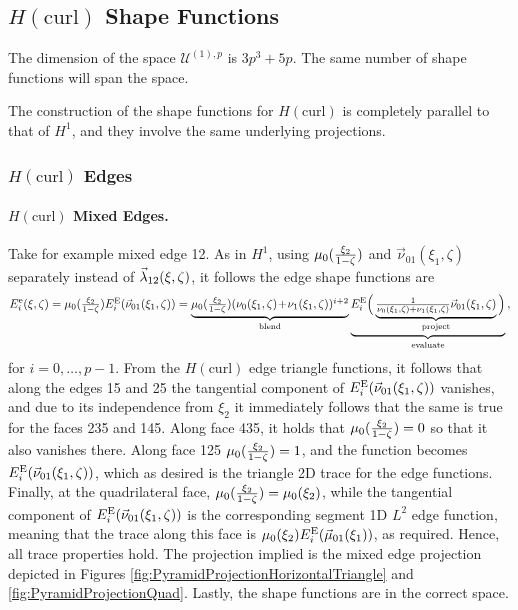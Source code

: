 \subsection{\texorpdfstring{$H(\mathrm{curl})$}{Hcurl} Shape Functions}

The dimension of the space $\mathcal{U}^{(1),p}$ is $3p^3+5p$.
The same number of shape functions will span the space.

The construction of the shape functions for $H(\mathrm{curl})$ is completely parallel to that of $H^1$, and they involve the same underlying projections.

\subsubsection{\texorpdfstring{$H(\mathrm{curl})$}{Hcurl} Edges}

\paragraph{\texorpdfstring{$H(\mathrm{curl})$}{Hcurl} Mixed Edges.} 
Take for example mixed edge 12.
As in $H^1$, using $\mu_0(\textstyle{\frac{\xi_2}{1-\zeta}})$ and $\vec{\nu}_{01}(\xi_1,\zeta)$ separately instead of $\vec{\lambda}_{12}(\xi,\zeta)$, it follows the edge shape functions are
\begin{equation*}
	E_i^\mathrm{e}(\xi,\zeta)=\mu_0(\textstyle{\frac{\xi_2}{1-\zeta}})E_i^{\mathrm{E}}(\vec{\nu}_{01}(\xi_1,\zeta))=
		\underbrace{\mu_0(\textstyle{\frac{\xi_2}{1-\zeta}})(\nu_0(\xi_1,\zeta)\!+\!\nu_1(\xi_1,\zeta))^{i+2}}_{\text{blend}}
    	\underbrace{E_i^{\mathrm{E}}\Big(\underbrace{\textstyle{\frac{1}{\nu_0(\xi_1,\zeta)+\nu_1(\xi_1,\zeta)}}
    		\vec{\nu}_{01}(\xi_1,\zeta)}_{\text{project}}\Big)}_{\text{evaluate}}\,,
\end{equation*}
for $i=0,\ldots,p-1$.
From the $H(\mathrm{curl})$ edge triangle functions, it follows that along the edges 15 and 25 the tangential component of $E_i^{\mathrm{E}}(\vec{\nu}_{01}(\xi_1,\zeta))$ vanishes, and due to its independence from $\xi_2$ it immediately follows that the same is true for the faces 235 and 145.
Along face 435, it holds that $\mu_0(\textstyle{\frac{\xi_2}{1-\zeta}})=0$ so that it also vanishes there.
Along face 125 $\mu_0(\textstyle{\frac{\xi_2}{1-\zeta}})=1$, and the function becomes $E_i^{\mathrm{E}}(\vec{\nu}_{01}(\xi_1,\zeta))$, which as desired is the triangle 2D trace for the edge functions.
Finally, at the quadrilateral face, $\mu_0(\textstyle{\frac{\xi_2}{1-\zeta}})=\mu_0(\xi_2)$, while the tangential component of $E_i^{\mathrm{E}}(\vec{\nu}_{01}(\xi_1,\zeta))$ is the corresponding segment 1D $L^2$ edge function, meaning that the trace along this face is $\mu_0(\xi_2)E_i^{\mathrm{E}}(\vec{\mu}_{01}(\xi_1))$, as required.
Hence, all trace properties hold.
The projection implied is the mixed edge projection depicted in Figures \ref{fig:PyramidProjectionHorizontalTriangle} and \ref{fig:PyramidProjectionQuad}.
Lastly, the shape functions are in the correct space.

